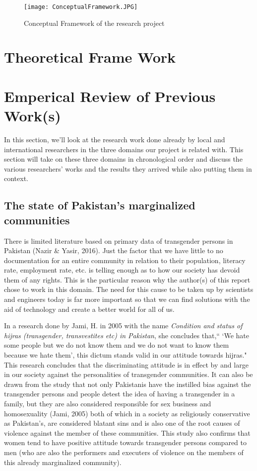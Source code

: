 \begin{figure}
  \caption{Conceptual Framework of the research project}
  \texttt{[image: ConceptualFramework.JPG]}
  \centering
\end{figure}

\section{Theoretical Frame Work}

\section{Emperical Review of Previous Work(s)}

In this section, we'll look at the research work done already by local and international researchers in the three domains our project is related with. This section will take on these three domains in chronological order and discuss the various researchers' works  and the results they arrived while also putting them in context.

\subsection{The state of Pakistan's marginalized communities}

There is limited literature based on primary data of transgender persons in Pakistan (Nazir \& Yasir, 2016). Just the factor that we have little to no documentation for an entire community in relation to their population, literacy rate, employment rate, etc. is telling enough as to how our society has devoid them of any rights. This is the particular reason why the author(s) of this report chose to work in this domain. The need for this cause to be taken up by scientists and engineers today is far more important so that we can find solutions with the aid of technology and create a better world for all of us. 

In a research done by Jami, H. in 2005 with the name \textit {Condition and status of hijras (transgender, transvestites etc) in Pakistan}, she concludes that,“ `We hate some people but we do not know them and we do not want to know them because we hate them', this dictum stands valid in our attitude towards hijras." This research concludes that the discriminating attitude is in effect by and large in our society against the personalities of transgender communities. It can also be drawn from the study that not only Pakistanis have the instilled bias against the transgender persons and people detest the idea of having a transgender in a family, but they are also considered responsible for sex business and homosexuality (Jami, 2005) both of which in a society as religiously conservative as Pakistan's, are considered blatant sins and is also one of the root causes of violence against the member of these communities. This study also confirms that women tend to have positive attitude towards transgender persons compared to men (who are also the performers and executers of violence on the members of this already marginalized community). 

